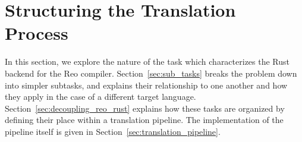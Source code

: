 %	
%	
%	


\section{Structuring the Translation Process}
\label{sec:two_phase}
In this section, we explore the nature of the task which characterizes the Rust backend for the Reo compiler. Section~\ref{sec:sub_tasks} breaks the problem down into simpler subtasks, and explains their relationship to one another and how they apply in the case of a different target language. Section~\ref{sec:decoupling_reo_rust} explains how these tasks are organized by defining their place within a translation pipeline. The implementation of the pipeline itself is given in Section~\ref{sec:translation_pipeline}.

